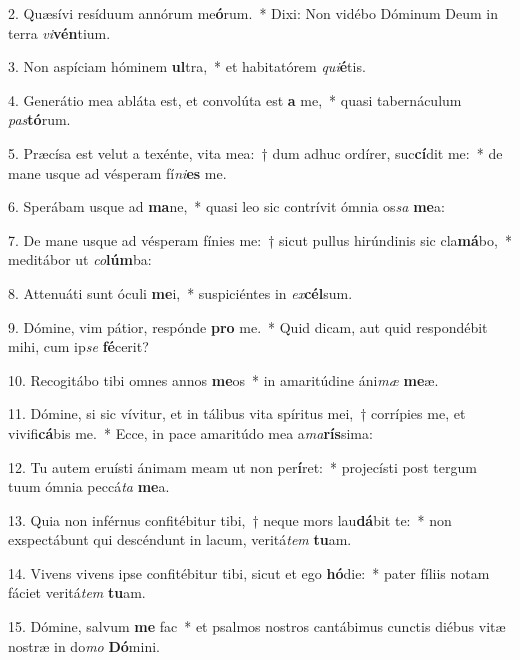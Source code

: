 ﻿2. Quæsívi resíduum annórum me\textbf{ó}rum.~* Dixi: Non vidébo Dóminum Deum in terra \textit{vi}\textbf{vén}tium.

3. Non aspíciam hóminem \textbf{ul}tra,~* et habitatórem \textit{qui}\textbf{é}tis.

4. Generátio mea abláta est, et convolúta est \textbf{a} me,~* quasi tabernáculum \textit{pas}\textbf{tó}rum.

5. Præcísa est velut a texénte, vita mea:~† dum adhuc ordírer, suc\textbf{cí}dit me:~* de mane usque ad vésperam fí\textit{ni}\textbf{es} me.

6. Sperábam usque ad \textbf{ma}ne,~* quasi leo sic contrívit ómnia os\textit{sa} \textbf{me}a:

7. De mane usque ad vésperam fínies me:~† sicut pullus hirúndinis sic cla\textbf{má}bo,~* meditábor ut \textit{co}\textbf{lúm}ba:

8. Attenuáti sunt óculi \textbf{me}i,~* suspiciéntes in \textit{ex}\textbf{cél}sum.

9. Dómine, vim pátior, respónde \textbf{pro} me.~* Quid dicam, aut quid respondébit mihi, cum ip\textit{se} \textbf{fé}cerit?

10. Recogitábo tibi omnes annos \textbf{me}os~* in amaritúdine áni\textit{mæ} \textbf{me}æ.

11. Dómine, si sic vívitur, et in tálibus vita spíritus mei,~† corrípies me, et vivifi\textbf{cá}bis me.~* Ecce, in pace amaritúdo mea a\textit{ma}\textbf{rís}sima:

12. Tu autem eruísti ánimam meam ut non per\textbf{í}ret:~* projecísti post tergum tuum ómnia peccá\textit{ta} \textbf{me}a.

13. Quia non inférnus confitébitur tibi,~† neque mors lau\textbf{dá}bit te:~* non exspectábunt qui descéndunt in lacum, veritá\textit{tem} \textbf{tu}am.

14. Vivens vivens ipse confitébitur tibi, sicut et ego \textbf{hó}die:~* pater fíliis notam fáciet veritá\textit{tem} \textbf{tu}am.

15. Dómine, salvum \textbf{me} fac~* et psalmos nostros cantábimus cunctis diébus vitæ nostræ in do\textit{mo} \textbf{Dó}mini.


